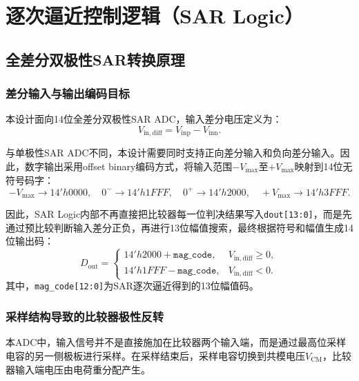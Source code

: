\chapter{逐次逼近控制逻辑（SAR Logic）}

\section{全差分双极性SAR转换原理}

\subsection{差分输入与输出编码目标}

本设计面向14位全差分双极性SAR ADC，输入差分电压定义为：
\begin{equation}
    V_{\mathrm{in,diff}} = V_{\mathrm{inp}} - V_{\mathrm{inn}}.
\end{equation}

与单极性SAR ADC不同，本设计需要同时支持正向差分输入和负向差分输入。因此，数字输出采用offset binary编码方式，将输入范围$-V_{\max}$至$+V_{\max}$映射到14位无符号码字：
\begin{equation}
    -V_{\max} \rightarrow 14'h0000,\quad
    0^- \rightarrow 14'h1FFF,\quad
    0^+ \rightarrow 14'h2000,\quad
    +V_{\max} \rightarrow 14'h3FFF.
\end{equation}

因此，SAR Logic内部不再直接把比较器每一位判决结果写入\texttt{dout[13:0]}，而是先通过预比较判断输入差分正负，再进行13位幅值搜索，最终根据符号和幅值生成14位输出码：
\begin{equation}
    D_{\mathrm{out}} =
    \begin{cases}
    14'h2000 + \texttt{mag\_code}, & V_{\mathrm{in,diff}} \ge 0,\\
    14'h1FFF - \texttt{mag\_code}, & V_{\mathrm{in,diff}} < 0.
    \end{cases}
\end{equation}
其中，\texttt{mag\_code[12:0]}为SAR逐次逼近得到的13位幅值码。

\subsection{采样结构导致的比较器极性反转}

本ADC中，输入信号并不是直接施加在比较器两个输入端，而是通过最高位采样电容的另一侧极板进行采样。在采样结束后，采样电容切换到共模电压$V_{\mathrm{CM}}$，比较器输入端电压由电荷重分配产生。

